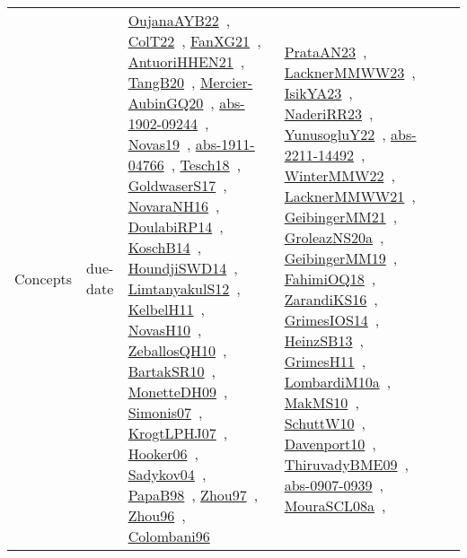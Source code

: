 {\begin{longtable}{lp{3cm}>{\raggedright\arraybackslash}p{6cm}>{\raggedright\arraybackslash}p{6cm}>{\raggedright\arraybackslash}p{8cm}}
Concepts & due-date & \href{works/OujanaAYB22.pdf}{OujanaAYB22}~\cite{OujanaAYB22}, \href{works/ColT22.pdf}{ColT22}~\cite{ColT22}, \href{works/FanXG21.pdf}{FanXG21}~\cite{FanXG21}, \href{works/AntuoriHHEN21.pdf}{AntuoriHHEN21}~\cite{AntuoriHHEN21}, \href{works/TangB20.pdf}{TangB20}~\cite{TangB20}, \href{works/Mercier-AubinGQ20.pdf}{Mercier-AubinGQ20}~\cite{Mercier-AubinGQ20}, \href{works/abs-1902-09244.pdf}{abs-1902-09244}~\cite{abs-1902-09244}, \href{works/Novas19.pdf}{Novas19}~\cite{Novas19}, \href{works/abs-1911-04766.pdf}{abs-1911-04766}~\cite{abs-1911-04766}, \href{works/Tesch18.pdf}{Tesch18}~\cite{Tesch18}, \href{works/GoldwaserS17.pdf}{GoldwaserS17}~\cite{GoldwaserS17}, \href{works/NovaraNH16.pdf}{NovaraNH16}~\cite{NovaraNH16}, \href{works/DoulabiRP14.pdf}{DoulabiRP14}~\cite{DoulabiRP14}, \href{works/KoschB14.pdf}{KoschB14}~\cite{KoschB14}, \href{works/HoundjiSWD14.pdf}{HoundjiSWD14}~\cite{HoundjiSWD14}, \href{works/LimtanyakulS12.pdf}{LimtanyakulS12}~\cite{LimtanyakulS12}, \href{works/KelbelH11.pdf}{KelbelH11}~\cite{KelbelH11}, \href{works/NovasH10.pdf}{NovasH10}~\cite{NovasH10}, \href{works/ZeballosQH10.pdf}{ZeballosQH10}~\cite{ZeballosQH10}, \href{works/BartakSR10.pdf}{BartakSR10}~\cite{BartakSR10}, \href{works/MonetteDH09.pdf}{MonetteDH09}~\cite{MonetteDH09}, \href{works/Simonis07.pdf}{Simonis07}~\cite{Simonis07}, \href{works/KrogtLPHJ07.pdf}{KrogtLPHJ07}~\cite{KrogtLPHJ07}, \href{works/Hooker06.pdf}{Hooker06}~\cite{Hooker06}, \href{works/Sadykov04.pdf}{Sadykov04}~\cite{Sadykov04}, \href{works/PapaB98.pdf}{PapaB98}~\cite{PapaB98}, \href{works/Zhou97.pdf}{Zhou97}~\cite{Zhou97}, \href{works/Zhou96.pdf}{Zhou96}~\cite{Zhou96}, \href{works/Colombani96.pdf}{Colombani96}~\cite{Colombani96} & \href{works/PrataAN23.pdf}{PrataAN23}~\cite{PrataAN23}, \href{works/LacknerMMWW23.pdf}{LacknerMMWW23}~\cite{LacknerMMWW23}, \href{works/IsikYA23.pdf}{IsikYA23}~\cite{IsikYA23}, \href{works/NaderiRR23.pdf}{NaderiRR23}~\cite{NaderiRR23}, \href{works/YunusogluY22.pdf}{YunusogluY22}~\cite{YunusogluY22}, \href{works/abs-2211-14492.pdf}{abs-2211-14492}~\cite{abs-2211-14492}, \href{works/WinterMMW22.pdf}{WinterMMW22}~\cite{WinterMMW22}, \href{works/LacknerMMWW21.pdf}{LacknerMMWW21}~\cite{LacknerMMWW21}, \href{works/GeibingerMM21.pdf}{GeibingerMM21}~\cite{GeibingerMM21}, \href{works/GroleazNS20a.pdf}{GroleazNS20a}~\cite{GroleazNS20a}, \href{works/GeibingerMM19.pdf}{GeibingerMM19}~\cite{GeibingerMM19}, \href{works/FahimiOQ18.pdf}{FahimiOQ18}~\cite{FahimiOQ18}, \href{works/ZarandiKS16.pdf}{ZarandiKS16}~\cite{ZarandiKS16}, \href{works/GrimesIOS14.pdf}{GrimesIOS14}~\cite{GrimesIOS14}, \href{works/HeinzSB13.pdf}{HeinzSB13}~\cite{HeinzSB13}, \href{works/GrimesH11.pdf}{GrimesH11}~\cite{GrimesH11}, \href{works/LombardiM10a.pdf}{LombardiM10a}~\cite{LombardiM10a}, \href{works/MakMS10.pdf}{MakMS10}~\cite{MakMS10}, \href{works/SchuttW10.pdf}{SchuttW10}~\cite{SchuttW10}, \href{works/Davenport10.pdf}{Davenport10}~\cite{Davenport10}, \href{works/ThiruvadyBME09.pdf}{ThiruvadyBME09}~\cite{ThiruvadyBME09}, \href{works/abs-0907-0939.pdf}{abs-0907-0939}~\cite{abs-0907-0939}, \href{works/MouraSCL08a.pdf}{MouraSCL08a}~\cite{MouraSCL08a}, 
\end{longtable}}
